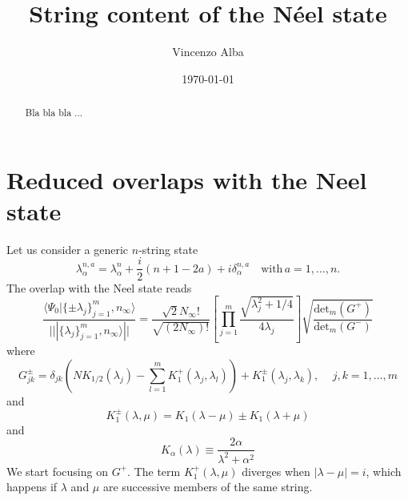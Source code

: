 \documentclass[12pt,a4paper,final]{iopart}
\begin{document}
\author{Vincenzo Alba}

\date{\today}


\title{String content of the N\'eel state} 


\begin{abstract} 
Bla bla bla ...
\end{abstract}


\maketitle

\section{Reduced overlaps with the Neel state}

Let us consider a generic $n$-string state
%
\begin{equation}
\lambda_\alpha^{n,a}=\lambda_\alpha^n+\frac{i}{2}(n+1-2a)+i\delta_\alpha^{n,a}\quad\textrm{with}\, a=1,\dots, n.
\end{equation}
%
The overlap with the Neel state reads 
%
\begin{equation}
\frac{\langle\Psi_0|\{\pm\lambda_j\}_{j=1}^m,n_\infty\rangle}{|||\{\lambda_j\}_{j=1}^m,n_\infty\rangle||}=
\frac{\sqrt{2}N_{\infty}!}{\sqrt{(2N_\infty)!}}\left[\prod_{j=1}^m\frac{\sqrt{\lambda_j^2+1/4}}{4\lambda_j}\right]
\sqrt{\frac{\textrm{det}_m(G^+)}{\textrm{det}_m(G^-)}}
\end{equation}
%
where 
%
\begin{equation}
G^{\pm}_{jk}=\delta_{jk}\left(NK_{1/2}(\lambda_j)-\sum\limits_{l=1}^mK_1^+(\lambda_j,\lambda_l)\right)
+K_{1}^{\pm}(\lambda_j,\lambda_k),\quad\,j,k=1,\dots,m
\end{equation}
%
and 
%
\begin{equation}
K_1^\pm(\lambda,\mu)=K_1(\lambda-\mu)\pm K_1(\lambda+\mu)
\end{equation}
%
and 
%
\begin{equation}
K_\alpha(\lambda)\equiv\frac{2\alpha}{\lambda^2+\alpha^2}
\end{equation}
%
We start focusing on $G^+$. The term $K_1^+(\lambda,\mu)$ diverges when 
$|\lambda-\mu|=i$, which happens if $\lambda$ and $\mu$ are successive members 
of the same string. 
\end{document}
